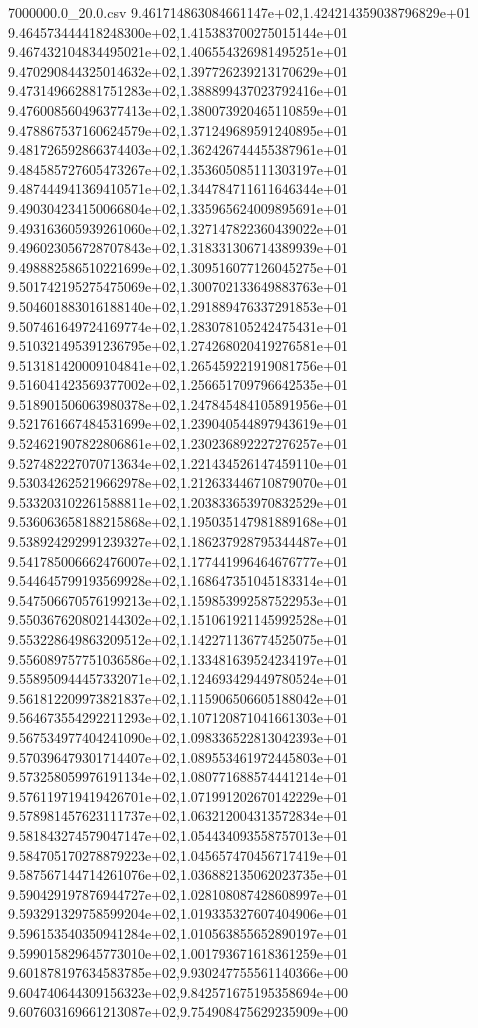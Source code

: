 \begin{filecontents*}{7000000.0_20.0.csv}
9.461714863084661147e+02,1.424214359038796829e+01
9.464573444418248300e+02,1.415383700275015144e+01
9.467432104834495021e+02,1.406554326981495251e+01
9.470290844325014632e+02,1.397726239213170629e+01
9.473149662881751283e+02,1.388899437023792416e+01
9.476008560496377413e+02,1.380073920465110859e+01
9.478867537160624579e+02,1.371249689591240895e+01
9.481726592866374403e+02,1.362426744455387961e+01
9.484585727605473267e+02,1.353605085111303197e+01
9.487444941369410571e+02,1.344784711611646344e+01
9.490304234150066804e+02,1.335965624009895691e+01
9.493163605939261060e+02,1.327147822360439022e+01
9.496023056728707843e+02,1.318331306714389939e+01
9.498882586510221699e+02,1.309516077126045275e+01
9.501742195275475069e+02,1.300702133649883763e+01
9.504601883016188140e+02,1.291889476337291853e+01
9.507461649724169774e+02,1.283078105242475431e+01
9.510321495391236795e+02,1.274268020419276581e+01
9.513181420009104841e+02,1.265459221919081756e+01
9.516041423569377002e+02,1.256651709796642535e+01
9.518901506063980378e+02,1.247845484105891956e+01
9.521761667484531699e+02,1.239040544897943619e+01
9.524621907822806861e+02,1.230236892227276257e+01
9.527482227070713634e+02,1.221434526147459110e+01
9.530342625219662978e+02,1.212633446710879070e+01
9.533203102261588811e+02,1.203833653970832529e+01
9.536063658188215868e+02,1.195035147981889168e+01
9.538924292991239327e+02,1.186237928795344487e+01
9.541785006662476007e+02,1.177441996464676777e+01
9.544645799193569928e+02,1.168647351045183314e+01
9.547506670576199213e+02,1.159853992587522953e+01
9.550367620802144302e+02,1.151061921145992528e+01
9.553228649863209512e+02,1.142271136774525075e+01
9.556089757751036586e+02,1.133481639524234197e+01
9.558950944457332071e+02,1.124693429449780524e+01
9.561812209973821837e+02,1.115906506605188042e+01
9.564673554292211293e+02,1.107120871041661303e+01
9.567534977404241090e+02,1.098336522813042393e+01
9.570396479301714407e+02,1.089553461972445803e+01
9.573258059976191134e+02,1.080771688574441214e+01
9.576119719419426701e+02,1.071991202670142229e+01
9.578981457623111737e+02,1.063212004313572834e+01
9.581843274579047147e+02,1.054434093558757013e+01
9.584705170278879223e+02,1.045657470456717419e+01
9.587567144714261076e+02,1.036882135062023735e+01
9.590429197876944727e+02,1.028108087428608997e+01
9.593291329758599204e+02,1.019335327607404906e+01
9.596153540350941284e+02,1.010563855652890197e+01
9.599015829645773010e+02,1.001793671618361259e+01
9.601878197634583785e+02,9.930247755561140366e+00
9.604740644309156323e+02,9.842571675195358694e+00
9.607603169661213087e+02,9.754908475629235909e+00

\end{filecontents*}
